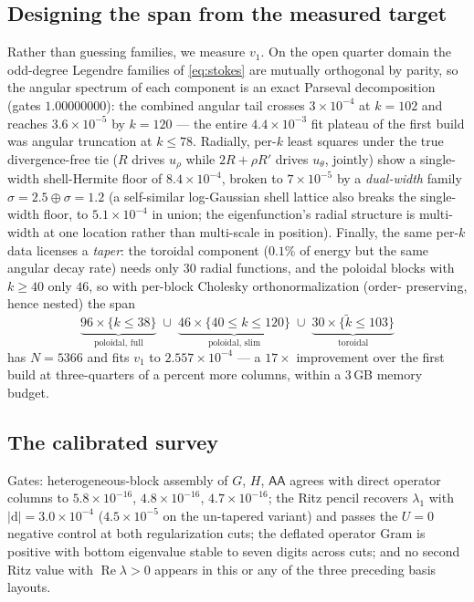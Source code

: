 \documentclass[11pt]{article}
\theoremstyle{plain}
\theoremstyle{remark}
\begin{document}
\subsection{Designing the span from the measured target}
\label{sec:design}
Rather than guessing families, we measure $v_1$. On the open quarter
domain the odd-degree Legendre families of \eqref{eq:stokes} are
mutually orthogonal by parity, so the angular spectrum of each
component is an exact Parseval decomposition (gates $1.00000000$): the
combined angular tail crosses $3\times 10^{-4}$ at $k = 102$ and
reaches $3.6\times 10^{-5}$ by $k = 120$ --- the entire
$4.4\times 10^{-3}$ fit plateau of the first build was angular
truncation at $k \le 78$. Radially, per-$k$ least squares under the
true divergence-free tie ($R$ drives $u_\rho$ while $2R + \rho R'$
drives $u_\theta$, jointly) show a single-width shell-Hermite floor of
$8.4\times 10^{-4}$, broken to $7\times 10^{-5}$ by a \emph{dual-width}
family $\sigma = 2.5 \oplus \sigma = 1.2$ (a self-similar
log-Gaussian shell lattice also breaks the single-width floor, to
$5.1\times 10^{-4}$ in union; the eigenfunction's radial structure is
multi-width at one location rather than multi-scale in position).
Finally, the same per-$k$ data licenses a \emph{taper}: the toroidal
component ($0.1\%$ of energy but the same angular decay rate) needs
only $30$ radial functions, and the poloidal blocks with $k \ge 40$
only $46$, so with per-block Cholesky orthonormalization (order-
preserving, hence nested) the span
\[
\underbrace{96 \times \{k \le 38\}}_{\text{poloidal, full}}
\;\cup\;
\underbrace{46 \times \{40 \le k \le 120\}}_{\text{poloidal, slim}}
\;\cup\;
\underbrace{30 \times \{\tilde k \le 103\}}_{\text{toroidal}}
\]
has $N = 5366$ and fits $v_1$ to $2.557\times 10^{-4}$ --- a
$17\times$ improvement over the first build at three-quarters of a
percent more columns, within a 3\,GB memory budget.

\subsection{The calibrated survey}\label{sec:calibsurvey}
Gates: heterogeneous-block assembly of $G$, $H$, $\mathsf{AA}$ agrees
with direct operator columns to $5.8\times 10^{-16}$,
$4.8\times 10^{-16}$, $4.7\times 10^{-16}$; the Ritz pencil recovers
$\lambda_1$ with $|\mathrm{d}| = 3.0\times 10^{-4}$
($4.5\times 10^{-5}$ on the un-tapered variant) and passes the $U=0$
negative control at both regularization cuts; the deflated operator
Gram is positive with bottom eigenvalue stable to seven digits across
cuts; and no second Ritz value with $\operatorname{Re}\lambda > 0$
appears in this or any of the three preceding basis layouts.
\end{document}
